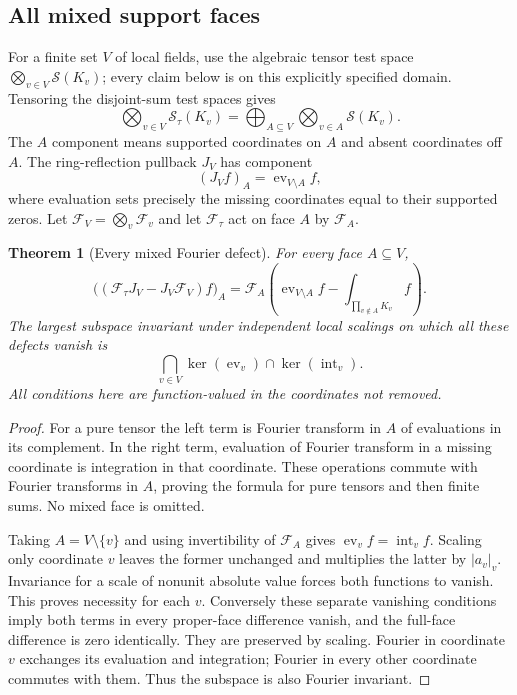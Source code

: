 \documentclass[11pt,a4paper]{article}
\newtheorem{theorem}{Theorem}[section]
\theoremstyle{definition}\newtheorem{definition}[theorem]{Definition}
\newcommand{\Sch}{\mathcal S}\newcommand{\im}{\operatorname{im}}
\begin{document}
\subsection{All mixed support faces}
For a finite set $V$ of local fields, use the algebraic tensor test space $\bigotimes_{v\in V}\Sch(K_v)$; every claim below is on this explicitly specified domain. Tensoring the disjoint-sum test spaces gives
\[
 \bigotimes_{v\in V}\Sch_\tau(K_v)
 =\bigoplus_{A\subseteq V}\bigotimes_{v\in A}\Sch(K_v).
\]
The $A$ component means supported coordinates on $A$ and absent coordinates off $A$. The ring-reflection pullback $J_V$ has component
\[
 (J_Vf)_A=\operatorname{ev}_{V\setminus A}f,
\]
where evaluation sets precisely the missing coordinates equal to their supported zeros. Let $\mathcal F_V=\bigotimes_v\mathcal F_v$ and let $\mathcal F_\tau$ act on face $A$ by $\mathcal F_A$.

\begin{theorem}[Every mixed Fourier defect]\label{thm:mixed-fourier-defect}
For every face $A\subseteq V$,
\begin{equation}\label{eq:mixed-defect}
 \bigl((\mathcal F_\tau J_V-J_V\mathcal F_V)f\bigr)_A
 =\mathcal F_A\left(\operatorname{ev}_{V\setminus A}f
                   -\int_{\prod_{v\notin A}K_v}f\right).
\end{equation}
The largest subspace invariant under independent local scalings on which all these defects vanish is
\begin{equation}\label{eq:full-mixed-Schwartz}
 \bigcap_{v\in V}\ker(\operatorname{ev}_v)\cap\ker(\operatorname{int}_v).
\end{equation}
All conditions here are function-valued in the coordinates not removed.
\end{theorem}
\begin{proof}
For a pure tensor the left term is Fourier transform in $A$ of evaluations in its complement. In the right term, evaluation of Fourier transform in a missing coordinate is integration in that coordinate. These operations commute with Fourier transforms in $A$, proving the formula for pure tensors and then finite sums. No mixed face is omitted.

Taking $A=V\setminus\{v\}$ and using invertibility of $\mathcal F_A$ gives $\operatorname{ev}_vf=\operatorname{int}_vf$. Scaling only coordinate $v$ leaves the former unchanged and multiplies the latter by $|a_v|_v$. Invariance for a scale of nonunit absolute value forces both functions to vanish. This proves necessity for each $v$. Conversely these separate vanishing conditions imply both terms in every proper-face difference vanish, and the full-face difference is zero identically. They are preserved by scaling. Fourier in coordinate $v$ exchanges its evaluation and integration; Fourier in every other coordinate commutes with them. Thus the subspace is also Fourier invariant.
\end{proof}
\end{document}
